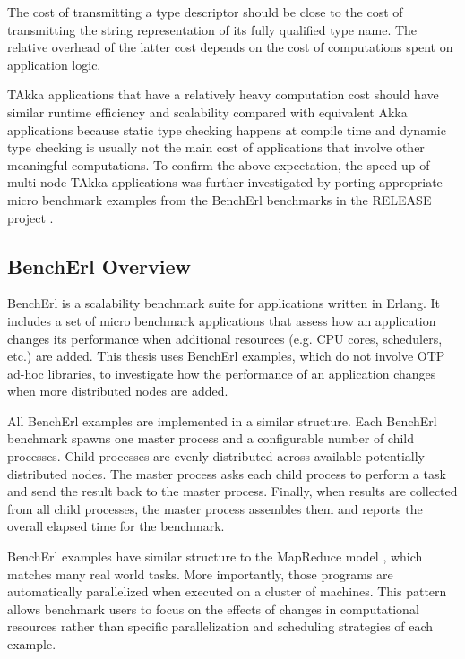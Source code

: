 The cost of transmitting a type descriptor should be close to the cost of 
transmitting the string representation of its fully qualified type name.  The 
relative overhead of the latter cost depends on the cost of computations 
spent on application logic.

TAkka applications that have a relatively heavy computation cost should have 
similar runtime efficiency and scalability compared with equivalent Akka 
applications because static type checking happens at compile time and dynamic 
type checking is usually not the main cost of applications that involve other 
meaningful computations.  To confirm the above expectation, the speed-up of 
multi-node TAkka applications was further investigated by porting 
appropriate micro benchmark examples from the BenchErl benchmarks in the 
RELEASE project \citep{RELEASE, aronis2012scalability}. 


\subsection{BenchErl Overview}
\label{bencherl_overview}

BenchErl \citep{RELEASE, aronis2012scalability} is a scalability benchmark suite 
for applications written in Erlang.  It includes a set of micro benchmark 
applications that assess how an application changes its performance when 
additional resources (e.g. CPU cores, schedulers, etc.) are added.  This thesis 
uses BenchErl examples, which do not involve OTP ad-hoc libraries, to 
investigate how the performance of an application changes when more distributed 
nodes are added.

All BenchErl examples are implemented in a similar structure.  Each BenchErl 
benchmark spawns one master process and a configurable number of child 
processes.  Child processes are evenly distributed across available 
potentially distributed nodes.  The master process asks each child process to 
perform a task and send the result back to the master process.  Finally, when 
results are collected from all child processes, the master process assembles 
them and reports the overall elapsed time for the benchmark.

BenchErl examples have similar structure to the MapReduce model 
\citep{dean2008mapreduce}, which matches many real world tasks.  More 
importantly, those programs are automatically parallelized when executed on 
a cluster of machines.  This pattern allows benchmark users to focus on the 
effects of changes in computational resources rather than specific 
parallelization and scheduling strategies of each example.



